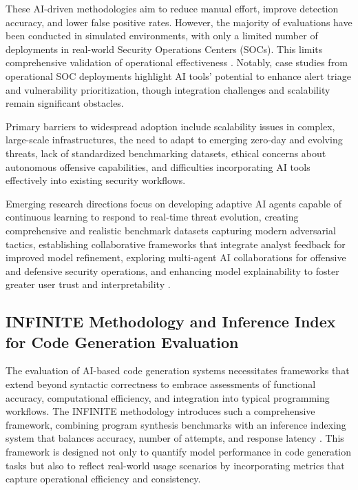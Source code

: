 \documentclass[sigconf]{acmart}
\begin{document}
These AI-driven methodologies aim to reduce manual effort, improve detection accuracy, and lower false positive rates. However, the majority of evaluations have been conducted in simulated environments, with only a limited number of deployments in real-world Security Operations Centers (SOCs). This limits comprehensive validation of operational effectiveness \cite{ref31}. Notably, case studies from operational SOC deployments highlight AI tools' potential to enhance alert triage and vulnerability prioritization, though integration challenges and scalability remain significant obstacles.

Primary barriers to widespread adoption include scalability issues in complex, large-scale infrastructures, the need to adapt to emerging zero-day and evolving threats, lack of standardized benchmarking datasets, ethical concerns about autonomous offensive capabilities, and difficulties incorporating AI tools effectively into existing security workflows.

Emerging research directions focus on developing adaptive AI agents capable of continuous learning to respond to real-time threat evolution, creating comprehensive and realistic benchmark datasets capturing modern adversarial tactics, establishing collaborative frameworks that integrate analyst feedback for improved model refinement, exploring multi-agent AI collaborations for offensive and defensive security operations, and enhancing model explainability to foster greater user trust and interpretability \cite{ref31}.

\subsection{INFINITE Methodology and Inference Index for Code Generation Evaluation}

The evaluation of AI-based code generation systems necessitates frameworks that extend beyond syntactic correctness to embrace assessments of functional accuracy, computational efficiency, and integration into typical programming workflows. The INFINITE methodology introduces such a comprehensive framework, combining program synthesis benchmarks with an inference indexing system that balances accuracy, number of attempts, and response latency \cite{ref9}. This framework is designed not only to quantify model performance in code generation tasks but also to reflect real-world usage scenarios by incorporating metrics that capture operational efficiency and consistency.
\end{document}
